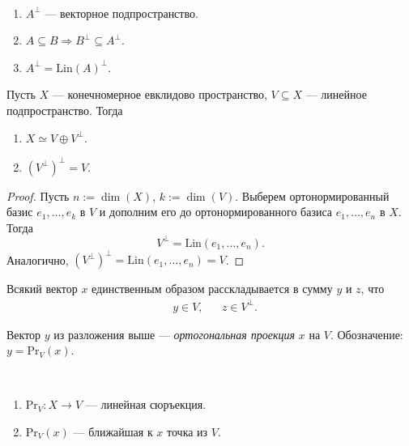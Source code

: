 \documentclass[12pt,a4paper]{article}
\newcommand{\Lin}{\ensuremath{\mathrm{Lin}}\xspace}
\renewcommand{\Pr}{\ensuremath{\mathrm{Pr}}\xspace}
\begin{document}
    \begin{lemma}\ 
        \begin{enumerate}
            \item $A^\perp$ --- векторное подпространство.
            \item $A \subseteq B \Longrightarrow B^\perp \subseteq A^\perp$.
            \item $A^\perp = \Lin(A)^\perp$.
        \end{enumerate}
    \end{lemma}

    \begin{theorem}
        Пусть $X$ --- конечномерное евклидово пространство, $V \subseteq X$ --- линейное подпространство. Тогда
        \begin{enumerate}
            \item $X \simeq V \oplus V^\perp$.
            \item $(V^\perp)^\perp = V$.
        \end{enumerate}
    \end{theorem}

    \begin{proof}
        Пусть $n := \dim(X)$, $k := \dim(V)$. Выберем ортонормированный базис $e_1, \dots, e_k$ в $V$ и дополним его до ортонормированного базиса $e_1, \dots, e_n$ в $X$. Тогда
        \[V^\perp = \Lin(e_1, \dots, e_n).\]
        Аналогично, $(V^\perp)^\perp = \Lin(e_1, \dots, e_n) = V$.
    \end{proof}

    \begin{corollary}
        Всякий вектор $x$ единственным образом расскладывается в сумму $y$ и $z$, что
        \begin{align*}
            &y \in V,&
            &z \in V^\perp.
        \end{align*}
    \end{corollary}

    \begin{definition}
        Вектор $y$ из разложения выше --- \emph{ортогональная проекция} $x$ на $V$. Обозначение: $y = \Pr_V(x)$.
    \end{definition}

    \begin{lemma}\ 
        \begin{enumerate}
            \item $\Pr_V: X \to V$ --- линейная сюръекция.
            \item $\Pr_V(x)$ --- ближайшая к $x$ точка из $V$.
        \end{enumerate}
    \end{lemma}
\end{document}
